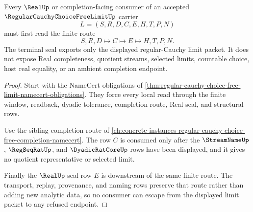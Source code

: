 \begin{theorem}
\label{thm:regular-cauchy-choice-free-limit-seal-nonescape}
Every $\RealUp$ or completion-facing consumer of an accepted $\RegularCauchyChoiceFreeLimitUp$ carrier
$$
L=(S,R,D,C,E,H,T,P,N)
$$
must first read the finite route
$$
S,R,D \longmapsto C \longmapsto E \longmapsto H,T,P,N.
$$
The terminal seal exports only the displayed regular-Cauchy limit packet. It does not expose Real completeness, quotient streams, selected limits, countable choice, host real equality, or an ambient completion endpoint.
\end{theorem}
\begin{proof}
Start with the NameCert obligations of \autoref{thm:regular-cauchy-choice-free-limit-namecert-obligations}. They force every local read through the finite window, readback, dyadic tolerance, completion route, Real seal, and structural rows.

Use the sibling completion route of \autoref{ch:concrete-instances-regular-cauchy-choice-free-completion-namecert}. The row $C$ is consumed only after the $\StreamNameUp$, $\RegSeqRatUp$, and $\DyadicRatCoreUp$ rows have been displayed, and it gives no quotient representative or selected limit.

Finally the $\RealUp$ seal row $E$ is downstream of the same finite route. The transport, replay, provenance, and naming rows preserve that route rather than adding new analytic data, so no consumer can escape from the displayed limit packet to any refused endpoint.
\end{proof}




